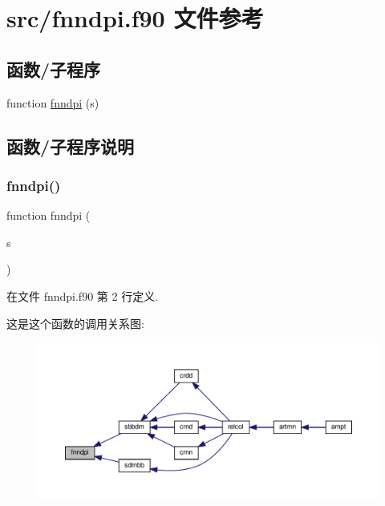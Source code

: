 \hypertarget{fnndpi_8f90}{}\section{src/fnndpi.f90 文件参考}
\label{fnndpi_8f90}
\subsection*{函数/子程序}
\begin{DoxyCompactItemize}
\item 
function \mbox{\hyperlink{fnndpi_8f90_aa62b555de1b10dba37c23a1dc46ff8fe}{fnndpi}} (s)
\end{DoxyCompactItemize}


\subsection{函数/子程序说明}
\mbox{\label{fnndpi_8f90_aa62b555de1b10dba37c23a1dc46ff8fe}} 
\subsubsection{\texorpdfstring{fnndpi()}{fnndpi()}}
{\footnotesize\ttfamily function fnndpi (\begin{DoxyParamCaption}\item[{}]{s }\end{DoxyParamCaption})}



在文件 fnndpi.\+f90 第 2 行定义.

这是这个函数的调用关系图\+:
\nopagebreak
\begin{figure}[H]
\begin{center}
\leavevmode
\includegraphics[width=350pt]{fnndpi_8f90_aa62b555de1b10dba37c23a1dc46ff8fe_icgraph}
\end{center}
\end{figure}
